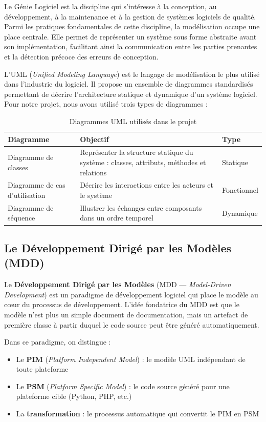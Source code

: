Le Génie Logiciel est la discipline qui s'intéresse à la conception, au développement, à la maintenance et à la gestion de systèmes logiciels de qualité. Parmi les pratiques fondamentales de cette discipline, la modélisation occupe une place centrale. Elle permet de représenter un système sous forme abstraite avant son implémentation, facilitant ainsi la communication entre les parties prenantes et la détection précoce des erreurs de conception.

L'UML (\textit{Unified Modeling Language}) est le langage de modélisation le plus utilisé dans l'industrie du logiciel. Il propose un ensemble de diagrammes standardisés permettant de décrire l'architecture statique et dynamique d'un système logiciel. Pour notre projet, nous avons utilisé trois types de diagrammes :

\begin{table}[htbp]
\centering
\renewcommand{\arraystretch}{1.4}
\begin{tabular}{|l|p{5cm}|l|}
\hline
\rowcolor{gray!30}
\textbf{Diagramme} & \textbf{Objectif} & \textbf{Type} \\
\hline
Diagramme de classes & Représenter la structure statique du système : classes, attributs, méthodes et relations & Statique \\
\hline
Diagramme de cas d'utilisation & Décrire les interactions entre les acteurs et le système & Fonctionnel \\
\hline
Diagramme de séquence & Illustrer les échanges entre composants dans un ordre temporel & Dynamique \\
\hline
\end{tabular}
\caption{Diagrammes UML utilisés dans le projet}
\end{table}

\subsection{Le Développement Dirigé par les Modèles (MDD)}

Le \textbf{Développement Dirigé par les Modèles} (MDD — \textit{Model-Driven Development}) est un paradigme de développement logiciel qui place le modèle au cœur du processus de développement. L'idée fondatrice du MDD est que le modèle n'est plus un simple document de documentation, mais un artefact de première classe à partir duquel le code source peut être généré automatiquement.

Dans ce paradigme, on distingue :
\begin{itemize}
    \item Le \textbf{PIM} (\textit{Platform Independent Model}) : le modèle UML indépendant de toute plateforme
    \item Le \textbf{PSM} (\textit{Platform Specific Model}) : le code source généré pour une plateforme cible (Python, PHP, etc.)
    \item La \textbf{transformation} : le processus automatique qui convertit le PIM en PSM
\end{itemize}

